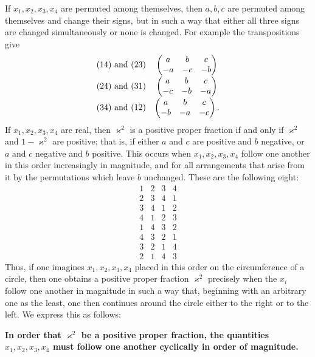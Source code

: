 \documentclass[11pt]{article}
\begin{document}
If $x_1,x_2,x_3,x_4$ are permuted among themselves, then $a,b,c$ are permuted among themselves and change their signs, but in such a way that either all three signs are changed simultaneously or none is changed. For example the transpositions give
\[
\begin{array}{c@{\quad}c}
(14)\text{ and }(23)&\begin{pmatrix}a&b&c\\-a&-c&-b\end{pmatrix}\\[0.7em]
(24)\text{ and }(31)&\begin{pmatrix}a&b&c\\-c&-b&-a\end{pmatrix}\\[0.7em]
(34)\text{ and }(12)&\begin{pmatrix}a&b&c\\-b&-a&-c\end{pmatrix}.
\end{array}
\]
If $x_1,x_2,x_3,x_4$ are real, then $\varkappa^2$ is a positive proper fraction if and only if $\varkappa^2$ and $1-\varkappa^2$ are positive; that is, if either $a$ and $c$ are positive and $b$ negative, or $a$ and $c$ negative and $b$ positive. This occurs when $x_1,x_2,x_3,x_4$ follow one another in this order increasingly in magnitude, and for all arrangements that arise from it by the permutations which leave $b$ unchanged. These are the following eight:
\[
\begin{array}{cccc}
1&2&3&4\\
2&3&4&1\\
3&4&1&2\\
4&1&2&3\\
1&4&3&2\\
4&3&2&1\\
3&2&1&4\\
2&1&4&3
\end{array}
\]
Thus, if one imagines $x_1,x_2,x_3,x_4$ placed in this order on the circumference of a circle, then one obtains a positive proper fraction $\varkappa^2$ precisely when the $x_i$ follow one another in magnitude in such a way that, beginning with an arbitrary one as the least, one then continues around the circle either to the right or to the left. We express this as follows:

\begin{center}
\textbf{In order that $\varkappa^2$ be a positive proper fraction, the quantities $x_1,x_2,x_3,x_4$ must follow one another cyclically in order of magnitude.}
\end{center}
\end{document}
